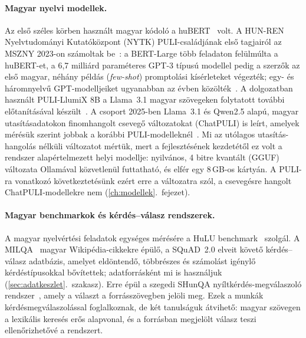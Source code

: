 \paragraph{Magyar nyelvi modellek.} Az első széles körben használt magyar kódoló a
huBERT~\cite{nemeskey2021hubert} volt. A HUN-REN Nyelvtudományi Kutatóközpont (NYTK) PULI-családjának első
tagjairól az MSZNY 2023-on számoltak be~\cite{yang2023jonnek}: a BERT-Large több feladaton felülmúlta a
huBERT-et, a 6,7 milliárd paraméteres GPT-3 típusú modellel pedig a szerzők az első magyar, néhány példás
(\emph{few-shot}) promptolási kísérleteket végezték; egy- és háromnyelvű GPT-modelljeiket ugyanabban az
évben közölték~\cite{yang2023puligpt3}. A dolgozatban használt PULI-LlumiX 8B a Llama~3.1 magyar
szövegeken folytatott további előtanításával készült~\cite{pulillumix}. A csoport 2025-ben Llama~3.1 és
Qwen2.5 alapú, magyar utasításadatokon finomhangolt csevegő változatokat (ChatPULI) is leírt, amelyek
mérésük szerint jobbak a korábbi PULI-modelleknél~\cite{yang2025chatpuli}. Mi az utólagos
utasítás-hangolás nélküli változatot mértük, mert a \Mimir{} fejlesztésének kezdetétől ez volt a rendszer
alapértelmezett helyi modellje: nyilvános, 4 bitre kvantált (GGUF) változata Ollamával közvetlenül futtatható,
és elfér egy 8\,GB-os kártyán. A PULI-ra vonatkozó következtetésünk ezért erre a változatra szól, a csevegésre
hangolt ChatPULI-modellekre nem (\ref{ch:modellek}.~fejezet).

\paragraph{Magyar benchmarkok és kérdés--válasz rendszerek.} A magyar nyelvértési feladatok egységes
mérésére a HuLU benchmark~\cite{ligetinagy2024hulu} szolgál. A MILQA~\cite{novak2023milqa,novak2023milqahu}
magyar Wikipédia-cikkekre épülő, a SQuAD~2.0 elveit követő kérdés--válasz adatbázis, amelyet eldöntendő,
többrészes és számolást igénylő kérdéstípusokkal bővítettek; adatforrásként mi is használjuk
(\ref{sec:adatkeszlet}.~szakasz). Erre épül a szegedi SHunQA nyíltkérdés-megválaszoló
rendszer~\cite{berkecz2024shunqa}, amely a választ a forrásszövegben jelöli meg. Ezek a munkák
kérdésmegválaszolással foglalkoznak, de két tanulságuk átvihető: magyar szövegen a lexikális keresés erős
alapvonal, és a forrásban megjelölt válasz teszi ellenőrizhetővé a rendszert.


